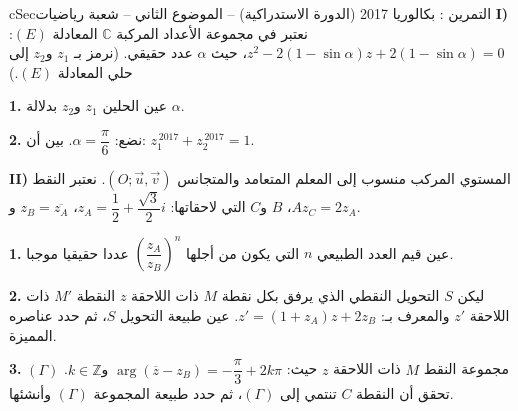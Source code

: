 \documentclass[12pt,a4paper]{article}
\newenvironment{BOX}[2]{\begin{otherlanguage}{english}\begin{arbox}{#1}{#2}}{\end{arbox}\end{otherlanguage}}
\newcounter{exo}
\newenvironment{tamrin}[1]{\stepcounter{exo}\begin{BOX}{cSec}{التمرين \theexo: #1}}{\end{BOX}}
\newcommand{\QQ}[1]{\par\smallskip\textbf{#1.} }
\begin{document}
\begin{tamrin}{بكالوريا 2017 (الدورة الاستدراكية) -- الموضوع الثاني -- شعبة رياضيات}
\textbf{I)} نعتبر في مجموعة الأعداد المركبة $\mathbb{C}$ المعادلة $(E)$: $z^2-2(1-\sin\alpha)z+2(1-\sin\alpha)=0$، حيث $\alpha$ عدد حقيقي.
(نرمز بـ $z_1$ و$z_2$ إلى حلي المعادلة $(E)$.)

\QQ{1} عين الحلين $z_1$ و$z_2$ بدلالة $\alpha$.

\QQ{2} نضع: $\alpha=\dfrac{\pi}{6}$. بين أن: $z_1^{\,2017}+z_2^{\,2017}=1$.

\textbf{II)} المستوي المركب منسوب إلى المعلم المتعامد والمتجانس $\left(O;\vec u,\vec v\right)$.
نعتبر النقط $A$، $B$ و$C$ التي لاحقاتها: $z_A=\dfrac12+\dfrac{\sqrt3}{2}i$، $z_B=\overline{z_A}$ و$z_C=2z_A$.

\QQ{1} عين قيم العدد الطبيعي $n$ التي يكون من أجلها $\left(\dfrac{z_A}{z_B}\right)^n$ عددا حقيقيا موجبا.

\QQ{2} ليكن $S$ التحويل النقطي الذي يرفق بكل نقطة $M$ ذات اللاحقة $z$ النقطة $M'$ ذات اللاحقة $z'$ والمعرف بـ: $z'=\left(1+z_A\right)z+2z_B$.
عين طبيعة التحويل $S$، ثم حدد عناصره المميزة.

\QQ{3} $(\Gamma)$ مجموعة النقط $M$ ذات اللاحقة $z$ حيث: $\arg\left(\overline{z}-z_B\right)=-\dfrac{\pi}{3}+2k\pi$ و$k\in\mathbb{Z}$.
تحقق أن النقطة $C$ تنتمي إلى $(\Gamma)$، ثم حدد طبيعة المجموعة $(\Gamma)$ وأنشئها.
\end{tamrin}
\end{document}
